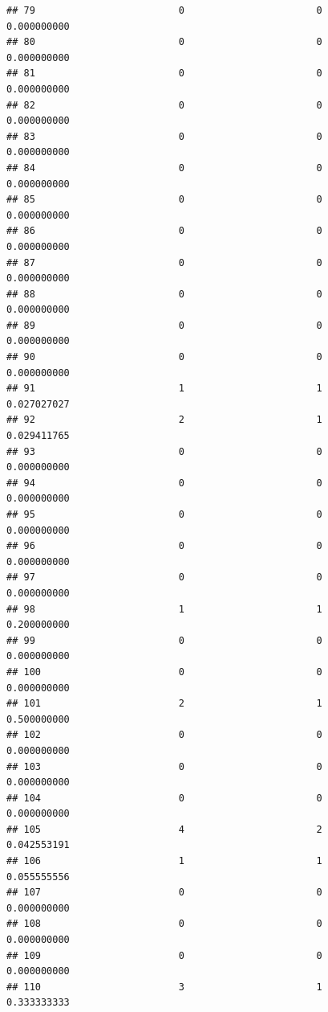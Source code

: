 \documentclass[
]{article}
\begin{document}
\begin{verbatim}
## 79                         0                       0               0.000000000
## 80                         0                       0               0.000000000
## 81                         0                       0               0.000000000
## 82                         0                       0               0.000000000
## 83                         0                       0               0.000000000
## 84                         0                       0               0.000000000
## 85                         0                       0               0.000000000
## 86                         0                       0               0.000000000
## 87                         0                       0               0.000000000
## 88                         0                       0               0.000000000
## 89                         0                       0               0.000000000
## 90                         0                       0               0.000000000
## 91                         1                       1               0.027027027
## 92                         2                       1               0.029411765
## 93                         0                       0               0.000000000
## 94                         0                       0               0.000000000
## 95                         0                       0               0.000000000
## 96                         0                       0               0.000000000
## 97                         0                       0               0.000000000
## 98                         1                       1               0.200000000
## 99                         0                       0               0.000000000
## 100                        0                       0               0.000000000
## 101                        2                       1               0.500000000
## 102                        0                       0               0.000000000
## 103                        0                       0               0.000000000
## 104                        0                       0               0.000000000
## 105                        4                       2               0.042553191
## 106                        1                       1               0.055555556
## 107                        0                       0               0.000000000
## 108                        0                       0               0.000000000
## 109                        0                       0               0.000000000
## 110                        3                       1               0.333333333

\end{verbatim}
\end{document}
